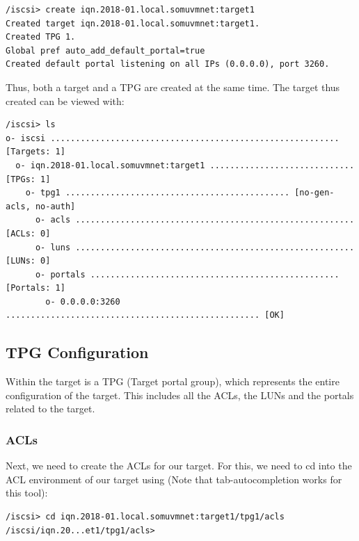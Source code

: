 \vspace{-15pt}
\begin{verbatim}
/iscsi> create iqn.2018-01.local.somuvmnet:target1
Created target iqn.2018-01.local.somuvmnet:target1.
Created TPG 1.
Global pref auto_add_default_portal=true
Created default portal listening on all IPs (0.0.0.0), port 3260.
\end{verbatim}
\vspace{-10pt}

\noindent
Thus, both a target and a TPG are created at the same time. The target thus created can be viewed with:

\vspace{-15pt}
\begin{verbatim}
/iscsi> ls
o- iscsi .......................................................... [Targets: 1]
  o- iqn.2018-01.local.somuvmnet:target1 ............................. [TPGs: 1]
    o- tpg1 ............................................. [no-gen-acls, no-auth]
      o- acls ........................................................ [ACLs: 0]
      o- luns ........................................................ [LUNs: 0]
      o- portals .................................................. [Portals: 1]
        o- 0.0.0.0:3260 ................................................... [OK]		
\end{verbatim}
\vspace{-10pt}

\subsection{TPG Configuration}
Within the target is a TPG (Target portal group), which represents the entire configuration of the target. This includes all the ACLs, the LUNs and the portals related to the target. 

\subsubsection{ACLs}
\vspace{-10pt}
Next, we need to create the ACLs for our target. For this, we need to cd into the ACL environment of our target using (Note that tab-autocompletion works for this tool):

\vspace{-15pt}
\begin{verbatim}
/iscsi> cd iqn.2018-01.local.somuvmnet:target1/tpg1/acls 
/iscsi/iqn.20...et1/tpg1/acls> 
\end{verbatim}
\vspace{-10pt}


